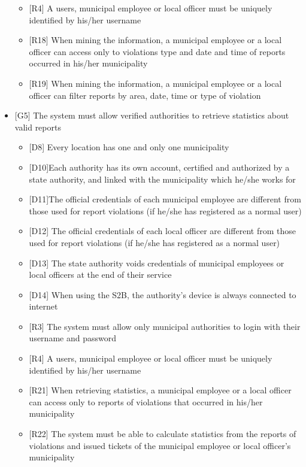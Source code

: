 \begin{itemize}
\begin{itemize}
								\item {[R4]} A users, municipal employee or local officer must be uniquely identified by his/her username
								\item {[R18]} When mining the information, a municipal employee or a local officer can access only to violations type and date and time of reports occurred in his/her municipality
								\item {[R19]} When mining the information, a municipal employee or a local officer can filter reports by area, date, time or type of violation
							\end{itemize}
						\item {[G5]} The system must allow verified authorities to retrieve statistics about valid reports
							\begin{itemize}
								\item {[D8]} Every location has one and only one municipality
								\item {[D10]}Each authority has its own account, certified and authorized by a state authority, and linked with the municipality which he/she works for 
								\item {[D11]}The official credentials of each municipal employee are different from those used for report violations (if he/she has registered as a normal user)
								\item {[D12]} The official credentials of each local officer are different from those used for report violations (if he/she has registered as a normal user)
								\item {[D13]} The state authority voids credentials of municipal employees or local officers at the end of their service
								\item {[D14]} When using the S2B, the authority's device is always connected to internet
								\item {[R3]} The system must allow only municipal authorities to login with their username and password
								\item {[R4]} A users, municipal employee or local officer must be uniquely identified by his/her username 
								\item {[R21]} When retrieving statistics, a municipal employee or a local officer can access only to reports of violations that occurred in his/her municipality
								\item {[R22]} The system must be able to calculate statistics from the reports of violations and issued tickets of the municipal employee or local officer's municipality

\end{itemize}
\end{itemize}
